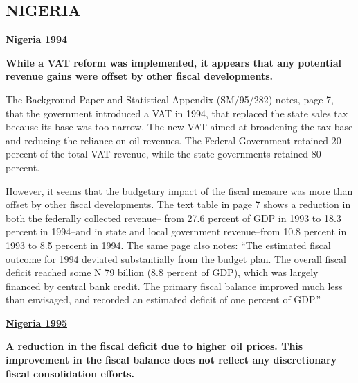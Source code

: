 \subsection[NIGERIA]{NIGERIA\protect\footnotemark}

\textbf{\underline{Nigeria 1994}}

\textbf{While a VAT reform was implemented, it appears that any potential revenue gains were offset by other fiscal developments.}

The Background Paper and Statistical Appendix (SM/95/282) notes, page 7, that the government introduced a VAT in 1994, that replaced the state sales tax because its base was too narrow. The new VAT aimed at broadening the tax base and reducing the reliance on oil revenues. The Federal Government retained 20 percent of the total VAT revenue, while the state governments retained 80 percent.

However, it seems that the budgetary impact of the fiscal measure was more than offset by other fiscal developments. The text table in page 7 shows a reduction in both the federally collected revenue-- from 27.6 percent of GDP in 1993 to 18.3 percent in 1994--and in state and local government revenue--from 10.8 percent in 1993 to 8.5 percent in 1994. The same page also notes: “The estimated fiscal outcome for 1994 deviated substantially from the budget plan. The overall fiscal deficit reached some N 79 billion (8.8 percent of GDP), which was largely financed by central bank credit. The primary fiscal balance improved much less than envisaged, and recorded an estimated deficit of one percent of GDP.”

\textbf{\underline{Nigeria 1995}}

\textbf{A reduction in the fiscal deficit due to higher oil prices. This improvement in the fiscal balance does not reflect any discretionary fiscal consolidation efforts.}

